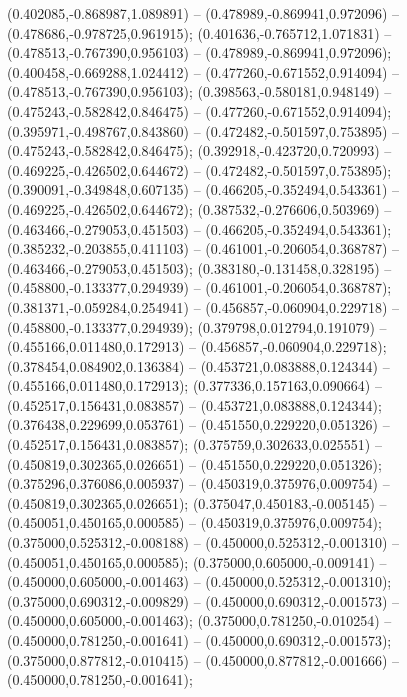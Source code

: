  (0.402085,-0.868987,1.089891) -- (0.478989,-0.869941,0.972096) -- (0.478686,-0.978725,0.961915);
 (0.401636,-0.765712,1.071831) -- (0.478513,-0.767390,0.956103) -- (0.478989,-0.869941,0.972096);
 (0.400458,-0.669288,1.024412) -- (0.477260,-0.671552,0.914094) -- (0.478513,-0.767390,0.956103);
 (0.398563,-0.580181,0.948149) -- (0.475243,-0.582842,0.846475) -- (0.477260,-0.671552,0.914094);
 (0.395971,-0.498767,0.843860) -- (0.472482,-0.501597,0.753895) -- (0.475243,-0.582842,0.846475);
 (0.392918,-0.423720,0.720993) -- (0.469225,-0.426502,0.644672) -- (0.472482,-0.501597,0.753895);
 (0.390091,-0.349848,0.607135) -- (0.466205,-0.352494,0.543361) -- (0.469225,-0.426502,0.644672);
 (0.387532,-0.276606,0.503969) -- (0.463466,-0.279053,0.451503) -- (0.466205,-0.352494,0.543361);
 (0.385232,-0.203855,0.411103) -- (0.461001,-0.206054,0.368787) -- (0.463466,-0.279053,0.451503);
 (0.383180,-0.131458,0.328195) -- (0.458800,-0.133377,0.294939) -- (0.461001,-0.206054,0.368787);
 (0.381371,-0.059284,0.254941) -- (0.456857,-0.060904,0.229718) -- (0.458800,-0.133377,0.294939);
 (0.379798,0.012794,0.191079) -- (0.455166,0.011480,0.172913) -- (0.456857,-0.060904,0.229718);
 (0.378454,0.084902,0.136384) -- (0.453721,0.083888,0.124344) -- (0.455166,0.011480,0.172913);
 (0.377336,0.157163,0.090664) -- (0.452517,0.156431,0.083857) -- (0.453721,0.083888,0.124344);
 (0.376438,0.229699,0.053761) -- (0.451550,0.229220,0.051326) -- (0.452517,0.156431,0.083857);
 (0.375759,0.302633,0.025551) -- (0.450819,0.302365,0.026651) -- (0.451550,0.229220,0.051326);
 (0.375296,0.376086,0.005937) -- (0.450319,0.375976,0.009754) -- (0.450819,0.302365,0.026651);
 (0.375047,0.450183,-0.005145) -- (0.450051,0.450165,0.000585) -- (0.450319,0.375976,0.009754);
 (0.375000,0.525312,-0.008188) -- (0.450000,0.525312,-0.001310) -- (0.450051,0.450165,0.000585);
 (0.375000,0.605000,-0.009141) -- (0.450000,0.605000,-0.001463) -- (0.450000,0.525312,-0.001310);
 (0.375000,0.690312,-0.009829) -- (0.450000,0.690312,-0.001573) -- (0.450000,0.605000,-0.001463);
 (0.375000,0.781250,-0.010254) -- (0.450000,0.781250,-0.001641) -- (0.450000,0.690312,-0.001573);
 (0.375000,0.877812,-0.010415) -- (0.450000,0.877812,-0.001666) -- (0.450000,0.781250,-0.001641);
